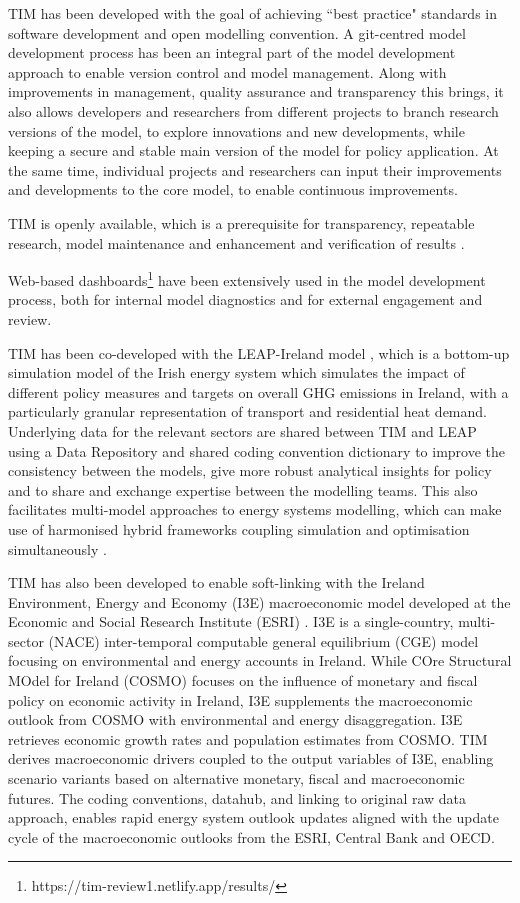 \documentclass[gmd,manuscript]{copernicus}
\begin{document}

TIM has been developed with the goal of achieving ``best practice" standards in software development and open modelling convention. A git-centred model development process has been an integral part of the model development approach to enable version control and model management. Along with improvements in management, quality assurance and transparency this brings, it also allows developers and researchers from different projects to branch research versions of the model, to explore innovations and new developments, while keeping a secure and stable main version of the model for policy application. At the same time, individual projects and researchers can input their improvements and developments to the core model, to enable continuous improvements. 

TIM is openly available, which is a prerequisite for transparency, repeatable research, model maintenance and enhancement and verification of results \citep{Pfenninger2018}. 

Web-based dashboards\footnote{https://tim-review1.netlify.app/results/} have been extensively used in the model development process, both for internal model diagnostics and for external engagement and review. 

TIM has been co-developed with the LEAP-Ireland model \citep{MacUidhir2020}, which is a bottom-up simulation model of the Irish energy system which simulates the impact of different policy measures and targets on overall GHG emissions in Ireland, with a particularly granular representation of transport and residential heat demand. Underlying data for the relevant sectors are shared between TIM and LEAP using a Data Repository and shared coding convention dictionary to improve the consistency between the models, give more robust analytical insights for policy and to share and exchange expertise between the modelling teams. This also facilitates multi-model approaches to energy systems modelling, which can make use of harmonised hybrid frameworks coupling simulation and optimisation simultaneously \citep{rogan2014leaps}.

TIM has also been developed to enable soft-linking with the Ireland Environment, Energy and Economy (I3E) macroeconomic model developed at the Economic and Social Research Institute (ESRI) \citep{Yakut2020}. I3E is a single-country, multi-sector (NACE) inter-temporal computable general equilibrium (CGE) model focusing on environmental and energy accounts in Ireland. While COre Structural MOdel for Ireland (COSMO) focuses on the influence of monetary and fiscal policy on economic activity in Ireland, I3E supplements the macroeconomic outlook from COSMO with environmental and energy disaggregation. I3E retrieves economic growth rates and population estimates from COSMO. TIM derives macroeconomic drivers coupled to the output variables of I3E, enabling scenario variants based on alternative monetary, fiscal and macroeconomic futures. The coding conventions, datahub, and linking to original raw data approach, enables rapid energy system outlook updates aligned with the update cycle of the macroeconomic outlooks from the ESRI, Central Bank and OECD.
\end{document}
